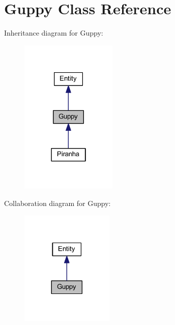\hypertarget{class_guppy}{}\section{Guppy Class Reference}
\label{class_guppy}


Inheritance diagram for Guppy\+:
\nopagebreak
\begin{figure}[H]
\begin{center}
\leavevmode
\includegraphics[width=130pt]{class_guppy__inherit__graph}
\end{center}
\end{figure}


Collaboration diagram for Guppy\+:
\nopagebreak
\begin{figure}[H]
\begin{center}
\leavevmode
\includegraphics[width=125pt]{class_guppy__coll__graph}
\end{center}
\end{figure}
